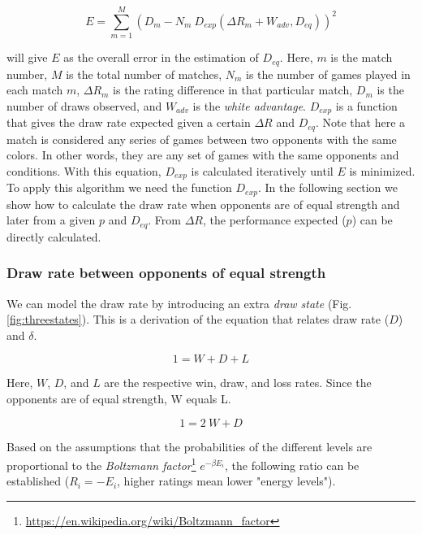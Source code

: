 \documentclass[12pt]{article}
\begin{document}
	\begin{equation} \label{eq:draw_rate_errors}
	E = \sum\limits_{m=1}^M (D_{m} - N_{m}\: D_{exp}(\Delta R_{m} + W_{adv}, D_{eq}))^2
	\end{equation}

will give $E$ as the overall error in the estimation of $D_{eq}$. 
Here, $m$ is the match number, $M$ is the total number of matches, $N_{m}$ is the number of games played in each match $m$, $\Delta R_{m}$ is the rating difference in that particular match, $D_{m}$ is the number of draws observed, and $W_{adv}$ is the \textit{white advantage}.
$D_{exp}$ is a function that gives the draw rate expected given a certain $\Delta R$ and $D_{eq}$. 
Note that here a match is considered any series of games between two opponents with the same colors. 
In other words, they are any set of games with the same opponents and conditions.
With this equation, $D_{exp}$ is calculated iteratively until $E$ is minimized. 
To apply this algorithm we need the function $D_{exp}$. 
In the following section we show how to calculate the draw rate when opponents are of equal strength and later from a given $p$ and $D_{eq}$.
From $\Delta R$, the performance expected ($p$) can be directly calculated.


\subsubsection*{Draw rate between opponents of equal strength}

We can model the draw rate by introducing an extra \textit{draw state} (Fig. \ref{fig:threestates}). 
This is a derivation of the equation that relates draw rate ($D$) and $\delta$.

	\begin{equation} \label{eq:basic_WDL}
	1 = W + D + L
	\end{equation}

Here, $W$, $D$, and $L$ are the respective win, draw, and loss rates. Since the opponents are of equal strength, W equals L.

	\begin{equation} \label{eq:erll}
	1 = 2\: W + D 
	\end{equation}

Based on the assumptions that the probabilities of the different levels are proportional to the \textit{Boltzmann factor}\footnote{\url{https://en.wikipedia.org/wiki/Boltzmann_factor}} $e^{-\beta E_{i}}$, the following ratio can be established ($R_{i}=-E_{i}$, higher ratings mean lower "energy levels").
\end{document}
